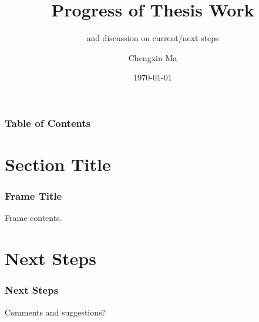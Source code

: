 \documentclass{beamer}
\title[Progress of Thesis Work] %
{Progress of Thesis Work}
\subtitle {and discussion on current/next steps}
\author[C Ma] %
{Chengxin Ma}
\institute[TU Delft] %
{
  \inst{}
  Faculty of Electrical Engineering, Mathematics and Computer Science \\
  Delft University of Technology
}
\date{\today}
\begin{document}
\frame{\titlepage}

\begin{frame}
\frametitle{Table of Contents}
\tableofcontents
\end{frame}

\section{Section Title}

\begin{frame}
\frametitle{Frame Title}

Frame contents.

\end{frame}


\section{Next Steps}


\begin{frame}
\frametitle{Next Steps}

Comments and suggestions?

\end{frame}
\end{document}
